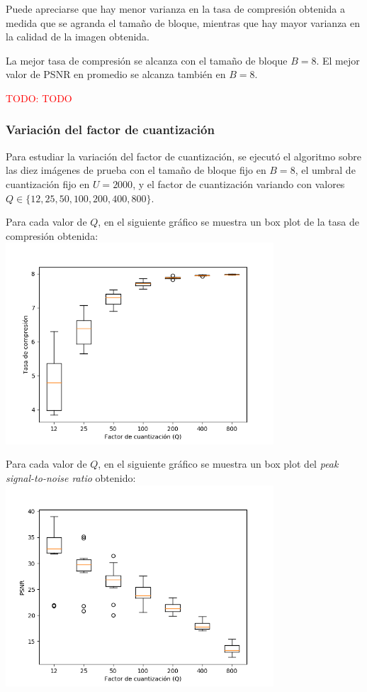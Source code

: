 \documentclass{article}
\newcommand{\set}[1]{\{#1\}}
\newcommand{\TODO}[1]{\textcolor{red}{TODO: #1}}
\begin{document}
Puede apreciarse que hay menor varianza en la tasa de compresión
obtenida a medida que se agranda el tamaño de bloque,
mientras que hay mayor varianza en la calidad de la imagen obtenida.

La mejor tasa de compresión se alcanza con el tamaño de bloque
$B = 8$. El mejor valor de PSNR en promedio se alcanza también
en $B = 8$.

\TODO{TODO}

\newpage
\subsubsection{Variación del factor de cuantización}

Para estudiar la variación del factor de cuantización, se ejecutó el
algoritmo sobre las diez imágenes de prueba con el
tamaño de bloque fijo en $B = 8$,
el umbral de cuantización fijo en $U = 2000$,
y el factor de cuantización variando con valores
$Q \in \set{12,25,50,100,200,400,800}$.

Para cada valor de $Q$, en el siguiente gráfico se muestra un
box plot de la tasa de compresión obtenida:\\
\includegraphics[width=10cm]{../imgs/output/gray_plots/q_rate.png}

Para cada valor de $Q$, en el siguiente gráfico se muestra un
box plot del {\em peak signal-to-noise ratio} obtenido:\\
\includegraphics[width=10cm]{../imgs/output/gray_plots/q_psnr.png}
\end{document}
